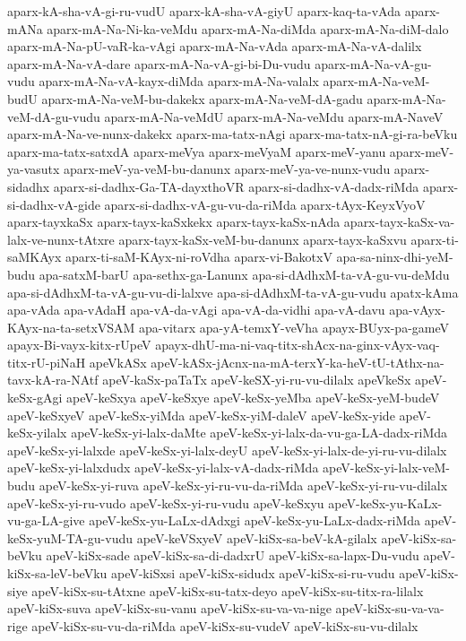 {aparx-kA-sha-vA-gi-ru-vudU
aparx-kA-sha-vA-giyU
aparx-kaq-ta-vAda
aparx-mANa
aparx-mA-Na-Ni-ka-veMdu
aparx-mA-Na-diMda
aparx-mA-Na-diM-dalo
aparx-mA-Na-pU-vaR-ka-vAgi
aparx-mA-Na-vAda
aparx-mA-Na-vA-dalilx
aparx-mA-Na-vA-dare
aparx-mA-Na-vA-gi-bi-Du-vudu
aparx-mA-Na-vA-gu-vudu
aparx-mA-Na-vA-kayx-diMda
aparx-mA-Na-valalx
aparx-mA-Na-veM-budU
aparx-mA-Na-veM-bu-dakekx
aparx-mA-Na-veM-dA-gadu
aparx-mA-Na-veM-dA-gu-vudu
aparx-mA-Na-veMdU
aparx-mA-Na-veMdu
aparx-mA-NaveV
aparx-mA-Na-ve-nunx-dakekx
aparx-ma-tatx-nAgi
aparx-ma-tatx-nA-gi-ra-beVku
aparx-ma-tatx-satxdA
aparx-meVya
aparx-meVyaM
aparx-meV-yanu
aparx-meV-ya-vasutx
aparx-meV-ya-veM-bu-danunx
aparx-meV-ya-ve-nunx-vudu
aparx-sidadhx
aparx-si-dadhx-Ga-TA-dayxthoVR
aparx-si-dadhx-vA-dadx-riMda
aparx-si-dadhx-vA-gide
aparx-si-dadhx-vA-gu-vu-da-riMda
aparx-tAyx-KeyxVyoV
aparx-tayxkaSx
aparx-tayx-kaSxkekx
aparx-tayx-kaSx-nAda
aparx-tayx-kaSx-va-lalx-ve-nunx-tAtxre
aparx-tayx-kaSx-veM-bu-danunx
aparx-tayx-kaSxvu
aparx-ti-saMKAyx
aparx-ti-saM-KAyx-ni-roVdha
aparx-vi-BakotxV
apa-sa-ninx-dhi-yeM-budu
apa-satxM-barU
apa-sethx-ga-Lanunx
apa-si-dAdhxM-ta-vA-gu-vu-deMdu
apa-si-dAdhxM-ta-vA-gu-vu-di-lalxve
apa-si-dAdhxM-ta-vA-gu-vudu
apatx-kAma
apa-vAda
apa-vAdaH
apa-vA-da-vAgi
apa-vA-da-vidhi
apa-vA-davu
apa-vAyx-KAyx-na-ta-setxVSAM
apa-vitarx
apa-yA-temxY-veVha
apayx-BUyx-pa-gameV
apayx-Bi-vayx-kitx-rUpeV
apayx-dhU-ma-ni-vaq-titx-shAcx-na-ginx-vAyx-vaq-titx-rU-piNaH
apeVkASx
apeV-kASx-jAcnx-na-mA-terxY-ka-heV-tU-tAthx-na-tavx-kA-ra-NAtf
apeV-kaSx-paTaTx
apeV-keSX-yi-ru-vu-dilalx
apeVkeSx
apeV-keSx-gAgi
apeV-keSxya
apeV-keSxye
apeV-keSx-yeMba
apeV-keSx-yeM-budeV
apeV-keSxyeV
apeV-keSx-yiMda
apeV-keSx-yiM-daleV
apeV-keSx-yide
apeV-keSx-yilalx
apeV-keSx-yi-lalx-daMte
apeV-keSx-yi-lalx-da-vu-ga-LA-dadx-riMda
apeV-keSx-yi-lalxde
apeV-keSx-yi-lalx-deyU
apeV-keSx-yi-lalx-de-yi-ru-vu-dilalx
apeV-keSx-yi-lalxdudx
apeV-keSx-yi-lalx-vA-dadx-riMda
apeV-keSx-yi-lalx-veM-budu
apeV-keSx-yi-ruva
apeV-keSx-yi-ru-vu-da-riMda
apeV-keSx-yi-ru-vu-dilalx
apeV-keSx-yi-ru-vudo
apeV-keSx-yi-ru-vudu
apeV-keSxyu
apeV-keSx-yu-KaLx-vu-ga-LA-give
apeV-keSx-yu-LaLx-dAdxgi
apeV-keSx-yu-LaLx-dadx-riMda
apeV-keSx-yuM-TA-gu-vudu
apeV-keVSxyeV
apeV-kiSx-sa-beV-kA-gilalx
apeV-kiSx-sa-beVku
apeV-kiSx-sade
apeV-kiSx-sa-di-dadxrU
apeV-kiSx-sa-lapx-Du-vudu
apeV-kiSx-sa-leV-beVku
apeV-kiSxsi
apeV-kiSx-sidudx
apeV-kiSx-si-ru-vudu
apeV-kiSx-siye
apeV-kiSx-su-tAtxne
apeV-kiSx-su-tatx-deyo
apeV-kiSx-su-titx-ra-lilalx
apeV-kiSx-suva
apeV-kiSx-su-vanu
apeV-kiSx-su-va-va-nige
apeV-kiSx-su-va-va-rige
apeV-kiSx-su-vu-da-riMda
apeV-kiSx-su-vudeV
apeV-kiSx-su-vu-dilalx
}
